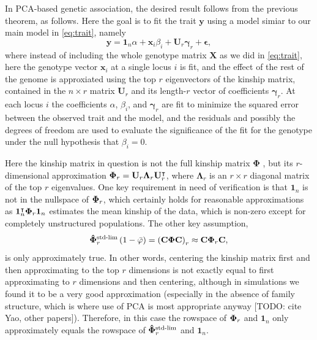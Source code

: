 \documentclass[11pt]{article}
\newcommand{\kinMat}{%
  \ensuremath{%
    \mathbf{\Phi}
  }%
  \xspace%
}%
\newcommand{\kinMatStdLim}{%
  \ensuremath{%
    \mathbf{\hat{\Phi}}^\text{std-lim}
  }%
  \xspace%
}%
\begin{document}
In PCA-based genetic association, the desired result follows from the previous theorem, as follows.
Here the goal is to fit the trait $\mathbf{y}$ using a model simiar to our main model in \cref{eq:trait}, namely
\begin{equation}
  \label{eq:pca_gwas}
  \mathbf{y}
  =
  \mathbf{1}_n \alpha + \mathbf{x}_i \beta_i + \mathbf{U}_r \mathbf{\gamma}_r + \mathbf{\epsilon}
  ,
\end{equation}
where instead of including the whole genotype matrix $\mathbf{X}$ as we did in \cref{eq:trait}, here the genotype vector $\mathbf{x}_i$ at a single locus $i$ is fit, and the effect of the rest of the genome is approxiated using the top $r$ eigenvectors of the kinship matrix, contained in the $n \times r$ matrix $\mathbf{U}_r$ and its length-$r$ vector of coefficients $\mathbf{\gamma}_r$.
At each locus $i$ the coefficients $\alpha$, $\beta_i$, and $\mathbf{\gamma}_r$ are fit to minimize the squared error between the observed trait and the model, and the residuals and possibly the degrees of freedom are used to evaluate the significance of the fit for the genotype under the null hypothesis that $\beta_i = 0$.

Here the kinship matrix in question is not the full kinship matrix \kinMat, but its $r$-dimensional approximation $\kinMat_r = \mathbf{U}_r \mathbf{\Lambda}_r \mathbf{U}_r^\intercal$, where $\mathbf{\Lambda}_r$ is an $r \times r$ diagonal matrix of the top $r$ eigenvalues.
One key requirement in need of verification is that $\mathbf{1}_n$ is not in the nullspace of $\kinMat_r$, which certainly holds for reasonable approximations as $\mathbf{1}_n^\intercal \kinMat_r \mathbf{1}_n$ estimates the mean kinship of the data, which is non-zero except for completely unstructured populations.
The other key assumption,
$$
\kinMatStdLim_r \left( 1 - \bar{\varphi} \right)
=
\left( \mathbf{C} \kinMat \mathbf{C} \right)_r
\approx
\mathbf{C} \kinMat_r \mathbf{C},
$$
is only approximately true.
In other words, centering the kinship matrix first and then approximating to the top $r$ dimensions is not exactly equal to first approximating to $r$ dimensions and then centering, although in simulations we found it to be a very good approximation (especially in the absence of family structure, which is where use of PCA is most appropriate anyway [TODO: cite Yao, other papers]).
Therefore, in this case the rowspace of $\kinMat_r$ and $\mathbf{1}_n$ only approximately equals the rowspace of $\kinMatStdLim_r$ and $\mathbf{1}_n$.
\end{document}

